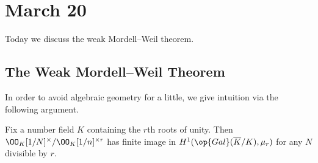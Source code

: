 \documentclass[../notes.tex]{subfiles}
\begin{document}
\section{March 20}

Today we discuss the weak Mordell--Weil theorem.

\subsection{The Weak Mordell--Weil Theorem}
In order to avoid algebraic geometry for a little, we give intuition via the following argument.
\begin{proposition}
	Fix a number field $K$ containing the $r$th roots of unity. Then $\OO_K[1/N]^\times/\OO_K[1/n]^{\times r}$ has finite image in $H^1(\op{Gal}(\overline K/K),\mu_r)$ for any $N$ divisible by $r$.
\end{proposition}
\end{document}
